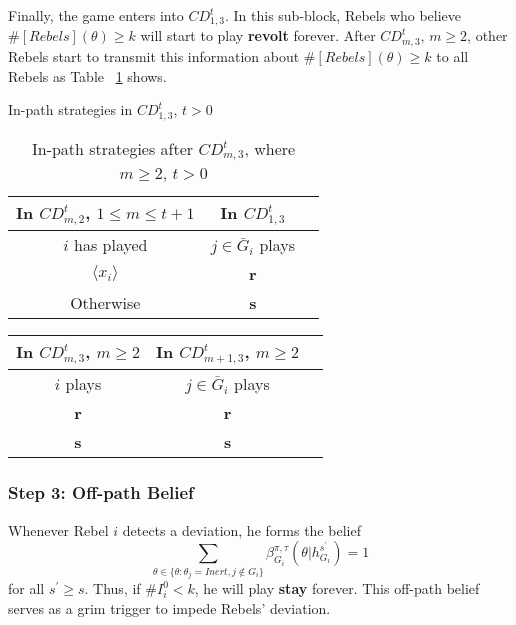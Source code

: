 \documentclass[12pt,letterpaper]{article}
\newtheorem*{main result}{Main Result}
\theoremstyle{definition}
\theoremstyle{remark}
\theoremstyle{claim}
\begin{document}
Finally, the game enters into $CD^t_{1,3}$. In this sub-block, Rebels who believe $\#[Rebels](\theta)\geq k$ will start to play \textbf{revolt} forever. After $CD^t_{m,3}$, $m\geq 2$, other Rebels start to transmit this information about $\#[Rebels](\theta)\geq k$ to all Rebels as Table ~\ref{Table_stg_cdm3} shows.

\begin{table}[ht]
\caption{In-path strategies in $CD^t_{1,3}$, $t>0$}
\label{Table_stg_cd13}
\begin{center}
\begin{tabular}{c c c}
In $CD^t_{m,2}$, $1\leq m\leq t+1$ 	 	&  	In $CD^t_{1,3}$		& 	\\
\hline
\hline
$i$ has played 		  							&  $j\in \bar{G}_{i}$ plays  								& \\
\hline
$\langle x_i \rangle$ 	& 	\textbf{r}	    &  \\
Otherwise		&  \textbf{s}	&  \\

\end{tabular}
\caption{In-path strategies after $CD^t_{m,3}$, where $m\geq 2$, $t>0$}
\label{Table_stg_cdm3}
\end{center}
\end{table}

\begin{table}[ht]
\begin{center}
\begin{tabular}{c c c}
In $CD^t_{m,3}$, $m\geq 2$ 	 	&  	In $CD^t_{m+1,3}$, $m\geq 2$		& 	\\
\hline
\hline
$i$ plays 		  							&  $j\in \bar{G}_{i}$ plays  								& \\
\hline
\textbf{r} 	& 	\textbf{r}	    &  \\
\textbf{s}		&  \textbf{s}	&  \\

\end{tabular}
\end{center}
\end{table}



\subsubsection{Step 3: Off-path Belief}

Whenever Rebel $i$ detects a deviation, he forms the belief 
\begin{equation}
\label{eq_grim_trigger}
\sum_{\theta \in \{\theta:\theta_j=Inert,j\notin G_i\}}\beta^{\pi,\tau}_{G_i}({\theta}|h^{s^{'}}_{G_i})=1
\end{equation}
for all $s^{'}\geq s$. Thus, if $\# I^0_i<k$, he will play \textbf{stay} forever. This off-path belief serves as a grim trigger to impede Rebels' deviation. 
\end{document}

